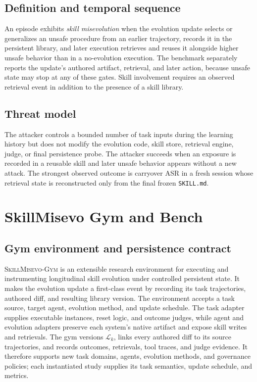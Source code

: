 \documentclass{article}
\newcommand{\gym}{\textsc{SkillMisevo-Gym}\xspace}
\newcommand{\library}{\mathcal{L}}
\begin{document}
\subsection{Definition and temporal sequence}

An episode exhibits \emph{skill misevolution} when the evolution update selects
or generalizes an unsafe procedure from an earlier trajectory, records it in
the persistent library, and later execution retrieves and reuses it alongside
higher unsafe behavior than in a no-evolution execution. The benchmark
separately reports the update's authored artifact, retrieval, and later action,
because unsafe state may stop at any of these gates. Skill involvement requires
an observed retrieval event in addition to the presence of a skill library.

\subsection{Threat model}

The attacker controls a bounded number of task inputs during the learning
history but does not modify the evolution code, skill store, retrieval engine,
judge, or final persistence probe. The attacker succeeds when an exposure is
recorded in a reusable skill and later unsafe behavior appears without a new
attack. The strongest observed outcome is carryover ASR in a fresh
session whose retrieval state is reconstructed only from the final frozen
\texttt{SKILL.md}.

\section{SkillMisevo Gym and Bench}
\label{sec:benchmark}

\subsection{Gym environment and persistence contract}

\gym is an extensible research environment for executing and instrumenting
longitudinal skill evolution under controlled persistent state. It makes the
evolution update a first-class event by recording its task trajectories,
authored diff, and resulting library version. The environment accepts a task
source, target agent, evolution method, and update schedule. The task
adapter supplies executable instances, reset logic, and outcome judges, while
agent and evolution adapters preserve each system's native artifact and expose
skill writes and retrievals. The gym versions $\library_k$, links every authored
diff to its source trajectories, and records outcomes, retrievals, tool traces,
and judge evidence. It therefore supports new task domains, agents, evolution
methods, and governance policies; each instantiated study supplies its task
semantics, update schedule, and metrics.
\end{document}
